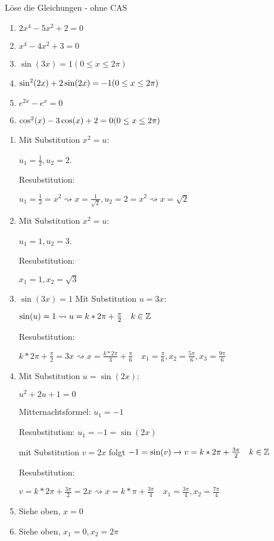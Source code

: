 Löse die Gleichungen - ohne CAS
\begin{multicols}{3}
  \begin{enumerate}
    \item $2x^4 - 5x^2 + 2 = 0$
    \item $x^4 - 4x^2 + 3 = 0$
    \item $\sin(3x) = 1 (0\leq x \leq 2\pi)$
    \item $\sin^2(2x) + 2\sin(2x) = -1 \\(0\leq x \leq 2\pi)$
    \item $e^{2x} - e^x = 0$
		\item $\cos^2(x)-3\cos(x)+2=0 \\(0\leq x \leq 2\pi)$
  \end{enumerate}
\end{multicols}

\begin{lsg}{}
	\begin{enumerate}
    \item Mit Substitution $x^2=u$:

		$u_1=\frac 1 2, u_2=2$.

		Resubstitution:

		$u_1=\frac 1 2 = x^2 \rightsquigarrow x=\frac 1{\sqrt 2},  u_2=2 = x^2 \rightsquigarrow x=\sqrt 2$
    \item Mit Substitution $x^2=u$:

		$u_1=1, u_2=3$.

		Resubstitution:

		$x_1=1, x_2=\sqrt 3$
    \item $\sin(3x) = 1$
		Mit Substitution $u=3x$:

		$\sin(u)=1 \rightsquigarrow u=k*2\pi+\frac {\pi} 2 \quad k\in\mathbb{Z}$

		Resubstitution:

		$k*2\pi+\frac {\pi} 2 = 3x \rightsquigarrow x=\frac {k*2\pi} 3+\frac {\pi} 6\quad x_1=\frac \pi 6, x_2=\frac {5\pi} 6, x_3=\frac{9\pi} 6$
    \item Mit Substitution $u=\sin(2x)$:

		$u^2 + 2u + 1 = 0$

		Mitternachtsformel: $u_1=-1$

		Resubstitution: $u_1=-1=\sin(2x)$

		mit Substitution $v=2x$ folgt $-1=\sin(v) \rightarrow v=k*2\pi+\frac {3\pi} 2 \quad k\in\mathbb{Z}$

		Resubstitution:

		$v=k*2\pi+\frac {3\pi} 2=2x \rightsquigarrow x=k*\pi+\frac {3\pi} 4 \quad x_1=\frac {3\pi} 4, x_2=\frac {7\pi} 4$
    \item Siehe oben, $x=0$
		\item Siehe oben, $x_1=0,x_2=2\pi$
  \end{enumerate}
\end{lsg}



